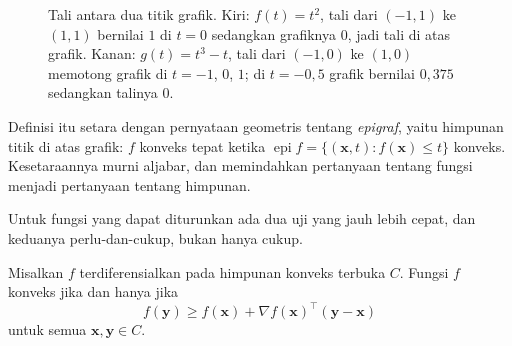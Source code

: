 \begin{figure}[!ht]
\centering
{}\quad
{}
\caption{Tali antara dua titik grafik. Kiri: $f(t)=t^{2}$, tali dari $(-1,1)$ ke $(1,1)$
bernilai $1$ di $t=0$ sedangkan grafiknya $0$, jadi tali di atas grafik. Kanan:
$g(t)=t^{3}-t$, tali dari $(-1,0)$ ke $(1,0)$ memotong grafik di $t=-1$, $0$, $1$; di
$t=-0{,}5$ grafik bernilai $0{,}375$ sedangkan talinya $0$.}
\label{fig:fungsi-konveks}
\end{figure}

Definisi itu setara dengan pernyataan geometris tentang \emph{epigraf}, yaitu himpunan
titik di atas grafik: $f$ konveks tepat ketika
$\operatorname{epi}f=\{(\mathbf{x},t):f(\mathbf{x})\le t\}$ konveks. Kesetaraannya murni
aljabar, dan memindahkan pertanyaan tentang fungsi menjadi pertanyaan tentang himpunan.

Untuk fungsi yang dapat diturunkan ada dua uji yang jauh lebih cepat, dan keduanya
perlu-dan-cukup, bukan hanya cukup.

\begin{teorema}
Misalkan $f$ terdiferensialkan pada himpunan konveks terbuka $C$. Fungsi $f$ konveks jika
dan hanya jika
\[
  f(\mathbf{y})\ge f(\mathbf{x})+\nabla f(\mathbf{x})^{\top}(\mathbf{y}-\mathbf{x})
\]
untuk semua $\mathbf{x},\mathbf{y}\in C$.
\end{teorema}

